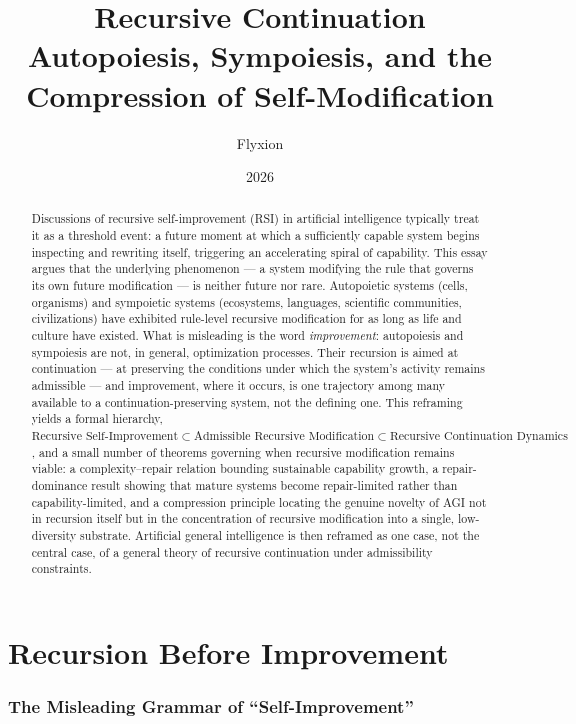 \documentclass[12pt,a4paper]{article}
\title{\textbf{Recursive Continuation}\\
\large Autopoiesis, Sympoiesis, and the Compression of Self-Modification}
\author{Flyxion}
\date{2026}
\theoremstyle{plain}
\theoremstyle{definition}
\theoremstyle{remark}
\begin{document}
\maketitle

\begin{abstract}
Discussions of recursive self-improvement (RSI) in artificial intelligence typically treat it as a threshold event: a future moment at which a sufficiently capable system begins inspecting and rewriting itself, triggering an accelerating spiral of capability. This essay argues that the underlying phenomenon — a system modifying the rule that governs its own future modification — is neither future nor rare. Autopoietic systems (cells, organisms) and sympoietic systems (ecosystems, languages, scientific communities, civilizations) have exhibited rule-level recursive modification for as long as life and culture have existed. What is misleading is the word \emph{improvement}: autopoiesis and sympoiesis are not, in general, optimization processes. Their recursion is aimed at continuation — at preserving the conditions under which the system's activity remains admissible — and improvement, where it occurs, is one trajectory among many available to a continuation-preserving system, not the defining one. This reframing yields a formal hierarchy, $\text{Recursive Self-Improvement} \subset \text{Admissible Recursive Modification} \subset \text{Recursive Continuation Dynamics}$, and a small number of theorems governing when recursive modification remains viable: a complexity–repair relation bounding sustainable capability growth, a repair-dominance result showing that mature systems become repair-limited rather than capability-limited, and a compression principle locating the genuine novelty of AGI not in recursion itself but in the concentration of recursive modification into a single, low-diversity substrate. Artificial general intelligence is then reframed as one case, not the central case, of a general theory of recursive continuation under admissibility constraints.
\end{abstract}
\newpage

\tableofcontents
\newpage

\part{Recursion Before Improvement}

\section{The Misleading Grammar of ``Self-Improvement''}
\label{sec:myth-of-novelty}
\end{document}
